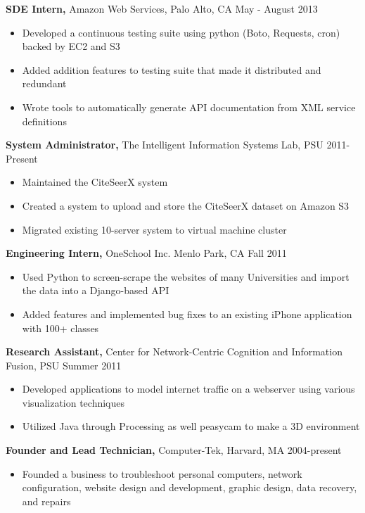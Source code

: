 \documentclass[margin]{res}
\begin{document}
\begin{resume}
{\bf SDE Intern,} Amazon Web Services, Palo Alto, CA \hfill May - August 2013
\begin{itemize} \itemsep -2pt  %
\item Developed a continuous testing suite using python (Boto, Requests, cron) backed by EC2 and S3
\item Added addition features to testing suite that made it distributed and redundant 
\item Wrote tools to automatically generate API documentation from XML service definitions
\end{itemize}

{\bf System Administrator,} The Intelligent Information Systems Lab, PSU \hfill 2011-Present
\begin{itemize} \itemsep -2pt  %
\item Maintained the CiteSeerX system 
\item Created a system to upload and store the CiteSeerX dataset on Amazon S3
\item Migrated existing 10-server system to virtual machine cluster 
\end{itemize}
 
{\bf Engineering Intern,} OneSchool Inc. Menlo Park, CA \hfill Fall 2011
\begin{itemize} \itemsep -2pt %
\item Used Python to screen-scrape the websites of many Universities and import the data into a Django-based API
\item Added features and implemented bug fixes to an existing iPhone application with 100+ classes
\end{itemize}

{\bf Research Assistant,} Center for Network-Centric Cognition and Information Fusion, PSU \hfill Summer 2011
\begin{itemize} \itemsep -2pt
\item Developed applications to model internet traffic on a webserver using various visualization techniques 
\item Utilized Java through Processing as well peasycam to make a 3D environment
\end{itemize}

{\bf Founder and Lead Technician,} Computer-Tek, Harvard, MA \hfill 2004-present
\begin{itemize} \itemsep -2pt
\item Founded a business to troubleshoot personal computers, network configuration, website design and development, graphic design, data recovery, and repairs
\end{itemize}


\end{resume}
\end{document}
